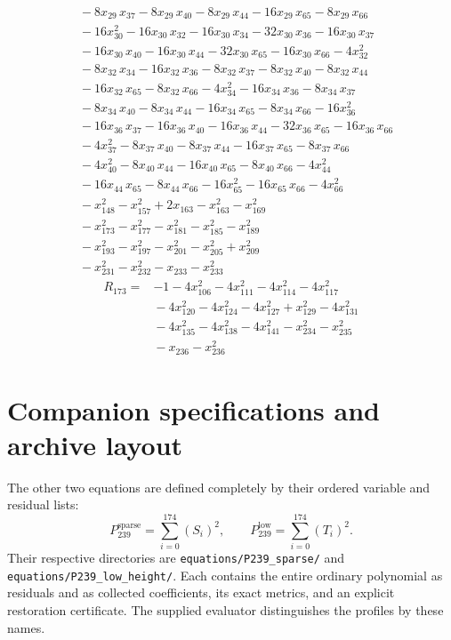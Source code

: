 \documentclass[11pt]{article}
\begin{document}
\begin{equation*}
\begin{aligned}
&{} - 8x_{29}\,x_{37} - 8x_{29}\,x_{40} - 8x_{29}\,x_{44} - 16x_{29}\,x_{65} - 8x_{29}\,x_{66} \\
&{} - 16x_{30}^{2} - 16x_{30}\,x_{32} - 16x_{30}\,x_{34} - 32x_{30}\,x_{36} - 16x_{30}\,x_{37} \\
&{} - 16x_{30}\,x_{40} - 16x_{30}\,x_{44} - 32x_{30}\,x_{65} - 16x_{30}\,x_{66} - 4x_{32}^{2} \\
&{} - 8x_{32}\,x_{34} - 16x_{32}\,x_{36} - 8x_{32}\,x_{37} - 8x_{32}\,x_{40} - 8x_{32}\,x_{44} \\
&{} - 16x_{32}\,x_{65} - 8x_{32}\,x_{66} - 4x_{34}^{2} - 16x_{34}\,x_{36} - 8x_{34}\,x_{37} \\
&{} - 8x_{34}\,x_{40} - 8x_{34}\,x_{44} - 16x_{34}\,x_{65} - 8x_{34}\,x_{66} - 16x_{36}^{2} \\
&{} - 16x_{36}\,x_{37} - 16x_{36}\,x_{40} - 16x_{36}\,x_{44} - 32x_{36}\,x_{65} - 16x_{36}\,x_{66} \\
&{} - 4x_{37}^{2} - 8x_{37}\,x_{40} - 8x_{37}\,x_{44} - 16x_{37}\,x_{65} - 8x_{37}\,x_{66} \\
&{} - 4x_{40}^{2} - 8x_{40}\,x_{44} - 16x_{40}\,x_{65} - 8x_{40}\,x_{66} - 4x_{44}^{2} \\
&{} - 16x_{44}\,x_{65} - 8x_{44}\,x_{66} - 16x_{65}^{2} - 16x_{65}\,x_{66} - 4x_{66}^{2} \\
&{} - x_{148}^{2} - x_{157}^{2} + 2x_{163} - x_{163}^{2} - x_{169}^{2} \\
&{} - x_{173}^{2} - x_{177}^{2} - x_{181}^{2} - x_{185}^{2} - x_{189}^{2} \\
&{} - x_{193}^{2} - x_{197}^{2} - x_{201}^{2} - x_{205}^{2} + x_{209}^{2} \\
&{} - x_{231}^{2} - x_{232}^{2} - x_{233} - x_{233}^{2}
\end{aligned}\end{equation*}
\begin{equation*}\begin{aligned}
R_{173}={}&-1 - 4x_{106}^{2} - 4x_{111}^{2} - 4x_{114}^{2} - 4x_{117}^{2} \\
&{} - 4x_{120}^{2} - 4x_{124}^{2} - 4x_{127}^{2} + x_{129}^{2} - 4x_{131}^{2} \\
&{} - 4x_{135}^{2} - 4x_{138}^{2} - 4x_{141}^{2} - x_{234}^{2} - x_{235}^{2} \\
&{} - x_{236} - x_{236}^{2}
\end{aligned}\end{equation*}

\endgroup
\section{Companion specifications and archive layout}
The other two equations are defined completely by their ordered variable
and residual lists:
\[
P_{239}^{\mathrm{sparse}}=\sum_{i=0}^{174}(S_i)^2,\qquad
P_{239}^{\mathrm{low}}=\sum_{i=0}^{174}(T_i)^2.
\]
Their respective directories are
\nolinkurl{equations/P239_sparse/} and
\nolinkurl{equations/P239_low_height/}.
Each contains the entire ordinary polynomial as residuals and as collected
coefficients, its exact metrics, and an explicit restoration certificate.
The supplied evaluator distinguishes the profiles by these names.
\end{document}
